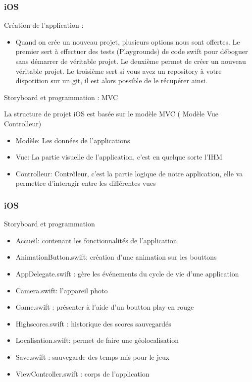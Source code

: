 \documentclass{beamer}
\begin{document}
\begin{frame}
\frametitle{iOS}
 \begin{block}{Création de l'application : }
    \begin{itemize}
    \item {Quand on crée un nouveau projet, plusieurs options nous sont offertes. Le premier sert à effectuer des tests (Playgrounds) de code swift pour déboguer sans démarrer de véritable projet. Le deuxième permet de créer un nouveau véritable projet. Le troisième sert si vous avez un repository à votre dispotition sur un git, il est alors possible de le récupérer ainsi.}
    \end{itemize}
  \end{block}

	\begin{block}{Storyboard et programmation  : MVC}
	\par La structure de projet iOS est basée sur le modèle MVC ( Modèle Vue Controlleur)
	 \begin{itemize}
    	\item {Modèle: Les données de l’applications }
	\item {Vue: La partie visuelle de l’application, c’est en quelque sorte l’IHM  }
	\item {Controlleur: Contrôleur, c’est la partie logique de notre application, elle va permettre d’interagir entre les différentes vues }
 
    \end{itemize}
	\end{block}
\end{frame}

\begin{frame}
\frametitle{iOS}
\begin{block}{Storyboard et programmation }
		 \begin{itemize}
\item {Accueil:  contenant les fonctionnalités de l'application} 
    	\item {AnimationButton.swift: création d'une animation sur les bouttons }
   	 \item {AppDelegate.swift : gère les événements du cycle de vie d'une application}
 	  \item {Camera.swift: l'appareil photo}	
  	  \item {Game.swift : présenter à l'aide d'un boutton play en rouge}
	 \item {Highscores.swift : historique des scores sauvegardés }
	    \item {Localisation.swift: permet de faire une  géolocalisation}
	    \item {Save.swift : sauvegarde des temps mis pour le jeux}
	    \item {ViewController.swift : corps de l'application}
  \end{itemize}
	\end{block}

\end{frame}
\end{document}
